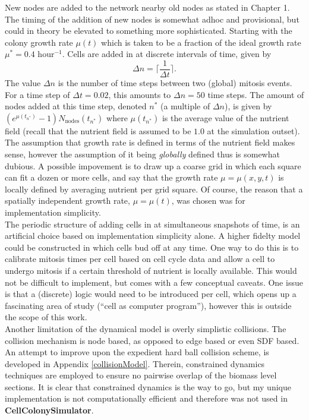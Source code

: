 New nodes are added to the network nearby old nodes as stated in Chapter 1. The timing
of the addition of new nodes is somewhat adhoc and provisional, but could in theory
be elevated to something more sophisticated. Starting with the colony growth rate 
$\mu(t)$ which is taken to be a fraction of the ideal growth rate $\mu^* = 0.4$ hour$^{-1}$.
Cells are added in at discrete intervals of time, given by 
\begin{equation*}
    \Delta n = \bigg\lceil \frac{1}{\Delta t} \bigg\rceil.
\end{equation*}
The value $\Delta n$ is the number of time steps between two (global) mitosis events. For a
time step of $\Delta t = 0.02$, this amounts to $\Delta n = 50$ time steps. The amount of 
nodes added at this time step, denoted $n^*$ (a multiple of $\Delta n$), is given by 
$(e^{\mu(t_{n^*})} -1) N_{\textrm{nodes}}(t_{n^*})$ where $\mu (t_{n^*})$ 
is the average value of the nutrient field (recall that the nutrient field is assumed to 
be $1.0$ at the simulation outset). The assumption that growth rate is defined
in terms of the nutrient field makes sense, however the assumption of it being \textit{globally} 
defined thus is somewhat dubious. A possible impovement is to draw up a coarse 
grid in which each square can fit a dozen or more cells, and say that 
the growth rate $\mu = \mu(x,y,t)$ is locally defined by averaging nutrient per grid square. 
Of course, the reason 
that a spatially independent growth rate, $\mu = \mu(t)$, was chosen was for 
implementation simplicity.
\\

The periodic structure of adding cells in at simultaneous snapshots of time,
is an artificial choice based on implementation simplicity alone. 
A higher fidelty model could be constructed in which cells bud off at any time.
One way to do this is to calibrate mitosis times per cell based on cell cycle data
and allow a cell to undergo mitosis if a certain threshold of nutrient is locally
available. This would not be difficult to implement, but 
comes with a few conceptual caveats. One issue is that 
a (discrete) logic would need to be introduced per cell,
which opens up a fascinating area of study (``cell as computer program''), however 
this is outside the scope of this work.
\\

Another limitation of the dynamical model is overly simplistic collisions.
The collision mechanism is node based, as 
opposed to edge based or even SDF based.
An attempt to improve upon the expedient hard ball collision scheme, 
is developed in Appendix \ref{collisionModel}. Therein,
constrained dynamics techniques are employed to ensure no pairwise
overlap of the biomass level sections. It is clear that constrained
dynamics is the way to go, but my unique implementation is 
not computationally efficient and therefore was not
used in \textbf{CellColonySimulator}.
\\

